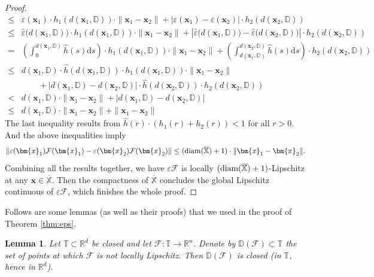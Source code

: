 \documentclass{amsart} %
\def\vx{{\bm{x}}}
\def\sD{{\mathbb{D}}}
\def\sR{{\mathbb{R}}}
\def\sT{{\mathbb{T}}}
\def\sX{{\mathbb{X}}}
\def\cF{{\mathcal{F}}}
\newtheorem{lemma}[theorem]{Lemma}
\theoremstyle{definition}
\theoremstyle{remark}
\begin{document}
\begin{proof}
\begin{align*}
   \leq & \varepsilon(\vx_1) \cdot h_1(d(\vx_1,\sD)) \cdot \|\vx_1- \vx_2\| + |\varepsilon(\vx_1) -\varepsilon(\vx_2)| \cdot  h_2(d(\vx_2,\sD)) \\
   \leq & \hat{\varepsilon}\Big(d(\vx_1,\sD)\Big) \cdot h_1(d(\vx_1,\sD)) \cdot \|\vx_1- \vx_2\| + \left |\hat{\varepsilon}\Big(d(\vx_1,\sD)\Big) -\hat{\varepsilon}\Big(d(\vx_2,\sD)\Big) \right| \cdot  h_2(d(\vx_2,\sD)) \\
   = & \left( \int_{0}^{d(\vx_1,\sD)} \hat{h}(s) \mathrm{d}s \right) \cdot h_1(d(\vx_1,\sD)) \cdot \|\vx_1- \vx_2\| + \left( \int_{d(\vx_1,\sD)}^{d(\vx_2,\sD)} \hat{h}(s) \mathrm{d}s \right)  \cdot  h_2(d(\vx_2,\sD))\\
   \leq & d(\vx_1,\sD) \cdot \hat{h}(d(\vx_1,\sD)) \cdot h_1(d(\vx_1,\sD)) \cdot \|\vx_1- \vx_2\| \\
    & \qquad + \Big| d(\vx_1,\sD) - d(\vx_2,\sD) \Big| \cdot \hat{h}(d(\vx_2,\sD)) \cdot h_2(d(\vx_2,\sD)) \\
    < & d(\vx_1,\sD) \cdot \|\vx_1- \vx_2\| + \Big| d(\vx_1,\sD) - d(\vx_2,\sD) \Big| \\
   \leq & d(\vx_1,\sD) \cdot \|\vx_1- \vx_2\| + \|\vx_1- \vx_2\|
\end{align*}
The last inequality results from $\hat{h}(r) \cdot (h_1(r) + h_2(r)) < 1$ for all $r > 0$. And the above inequalities imply
\[ \|\varepsilon(\vx_1)\cF(\vx_1) - \varepsilon(\vx_2)\cF(\vx_2)\| \leq (\textup{diam}(\overline{\sX})+1)\cdot
\|\vx_1-\vx_2\|.\]
Combining all the results together, we have $\varepsilon \cF$ is locally $(\textup{diam}(\overline{\sX})+1)$-Lipschitz at any $\vx \in \overline{\sX}$. Then the compactness of $\overline{\sX}$ concludes the global Lipschitz continuous of $\varepsilon \cF$, which finishes the whole proof.
\end{proof}

Follows are some lemmas (as well as their proofs) that we used in the proof of Theorem \ref{thm:eps}.

\begin{lemma}
\label{lemma:local-lip-closed}
Let $\sT \subset\sR^d$ be closed and let $\cF:\sT\to\sR^n$. 
Denote by $\sD(\cF)\subset\sT$ the set of points at which $\cF$ is \emph{not}
locally Lipschitz. Then $\sD(\cF)$ is closed (in $\sT$, hence in $\sR^d$).
\end{lemma}
\end{document}
